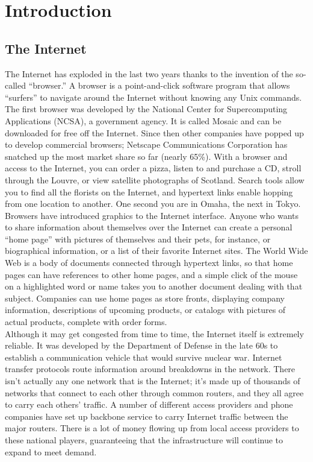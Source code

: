 \chapter{Introduction}
\section{The Internet}

The Internet has exploded in the last two years thanks to the invention
of the so-called ``browser.'' A browser is a point-and-click software
program that allows ``surfers'' to navigate around the Internet without
knowing any Unix commands. The first browser was developed by the
National Center for Supercomputing Applications (NCSA), a government
agency. It is called Mosaic and can be downloaded for free off the
Internet. Since then other companies have popped up to develop
commercial browsers; Netscape Communications Corporation has snatched
up the most market share so far (nearly 65\%). With a browser and access
to the Internet, you can order a pizza, listen to and purchase a CD,
stroll through the Louvre, or view satellite photographs of Scotland.
Search tools allow you to find all the florists on the Internet, and
hypertext links enable hopping from one location to another. One second
you are in Omaha, the next in Tokyo.\\

Browsers have introduced graphics to the Internet interface. Anyone who
wants to share information about themselves over the Internet can
create a personal ``home page'' with pictures of themselves and their
pets, for instance, or biographical information, or a list of their
favorite Internet sites. The World Wide Web is a body of documents
connected through hypertext links, so that home pages can have
references to other home pages, and a simple click of the mouse on a
highlighted word or name takes you to another document dealing with
that subject. Companies can use home pages as store fronts, displaying
company information, descriptions of upcoming products, or catalogs
with pictures of actual products, complete with order forms.\\

Although it may get congested from time to time, the Internet itself is
extremely reliable. It was developed by the Department of Defense in
the late 60s to establish a communication vehicle that would survive
nuclear war. Internet transfer protocols route information around
breakdowns in the network. There isn't actually any one network that is
the Internet; it's made up of thousands of networks that connect to
each other through common routers, and they all agree to carry each
others' traffic. A number of different access providers and phone
companies have set up backbone service to carry Internet traffic
between the major routers. There is a lot of money flowing up from
local access providers to these national players, guaranteeing that the
infrastructure will continue to expand to meet demand.\\

